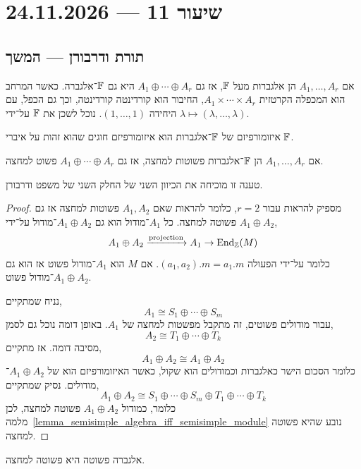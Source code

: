 \section{שיעור 11 --- 24.11.2026}
\subsection{תורת ודרבורן --- המשך}
\begin{proposition}
	אם $A_1, \ldots, A_r$ הן אלגברות מעל $\mathbb{F}$, אז גם $A_1 \oplus \cdots \oplus A_r$ היא גם $\mathbb{F}$־אלגברה.
	כאשר המרחב הוא המכפלה הקרטזית $A_1 \times \cdots \times A_r$, החיבור הוא קורדינטה קורדינטה, וכך גם הכפל, עם היחידה $(1, \ldots, 1)$.
	נוכל לשכן את $\mathbb{F}$ על־ידי $\lambda \mapsto (\lambda, \ldots, \lambda)$.
\end{proposition}
\begin{remark}
	איזומורפיזם של $\mathbb{F}$־אלגברות הוא איזומורפיזם חוגים שהוא זהות על איברי $\mathbb{F}$.
\end{remark}
\begin{proposition}
	אם $A_1, \ldots, A_r$ הן $\mathbb{F}$־אלגברות פשוטות למחצה, אז גם $A_1 \oplus \cdots \oplus A_r$ פשוט למחצה.
\end{proposition}
\begin{remark}
	טענה זו מוכיחה את הכיוון השני של החלק השני של משפט ודרבורן.
\end{remark}
\begin{proof}
	מספיק להראות עבור $r = 2$, כלומר להראות שאם $A_1, A_2$ פשוטות למחצה אז גם $A_1 \oplus A_2$ פשוטה למחצה.
	כל $A_1$־מודול הוא גם $A_1 \oplus A_2$־מודול על־ידי,
	\[
		A_1 \oplus A_2
		\xrightarrow{\text{projection}} A_1
		\to \operatorname{End}_{\mathbb{Z}}(M)
	\]
	כלומר על־ידי הפעולה $(a_1, a_2) . m = a_1 . m$.
	אם $M$ הוא $A_1$־מודול פשוט אז הוא גם $A_1 \oplus A_2$־מודול פשוט.

	נניח שמתקיים,
	\[
		A_1
		\cong S_1 \oplus \cdots \oplus S_m
	\]
	עבור מודולים פשוטים, זה מתקבל מפשטות למחצה של $A_1$.
	באופן דומה נוכל גם לסמן,
	\[
		A_2
		\cong T_1 \oplus \cdots \oplus T_k
	\]
	מסיבה דומה.
	אז מתקיים,
	\[
		A_1 \oplus A_2
		\cong A_1 \oplus A_2
	\]
	כלומר הסכום הישר כאלגברות וכמודולים הוא שקול, כאשר האיזומורפיזם הוא של $A_1 \oplus A_2$־מודולים.
	נסיק שמתקיים,
	\[
		A_1 \oplus A_2
		\cong S_1 \oplus \cdots \oplus S_m \oplus T_1 \oplus \cdots \oplus T_k
	\]
	כלומר, כמודול $A_1 \oplus A_2$ פשוטה למחצה, לכן מלמה\ \ref{lemma_semisimple_algebra_iff_semisimple_module} נובע שהיא פשוטה למחצה.
\end{proof}
\begin{theorem}
	אלגברה פשוטה היא פשוטה למחצה.
\end{theorem}
